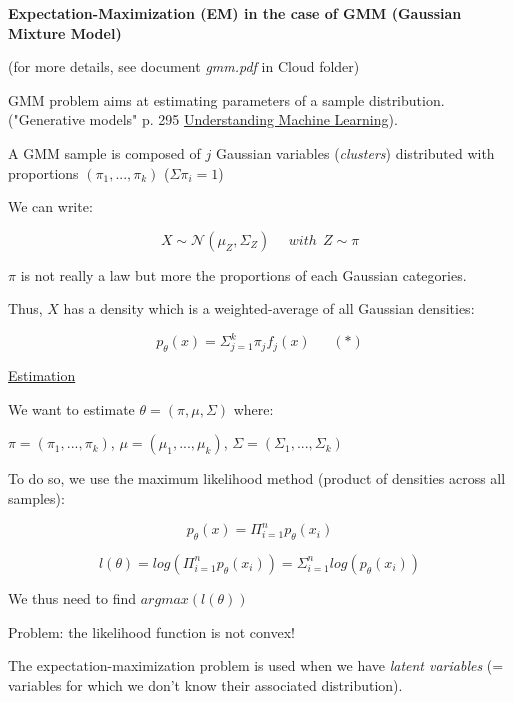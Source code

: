{\fontsize{12pt}{22pt} \textbf{Expectation-Maximization (EM) in the case of GMM (Gaussian Mixture Model)}\par}

\vspace{5mm}

(for more details, see document \textit{gmm.pdf} in Cloud folder)

\vspace{5mm}

GMM problem aims at estimating parameters of a sample distribution. ("Generative models" p. 295 \underline{Understanding Machine Learning}).

\vspace{5mm}

A GMM sample is composed of $j$ Gaussian variables (\textit{clusters}) distributed with proportions $(\pi_1,...,\pi_k)$ ($\Sigma \pi_i =1$)

We can write:

$$X \sim \mathcal{N}(\mu_{Z},\Sigma_{Z})~~~~~~with~~Z \sim \pi$$

$\pi$ is not really a law but more the proportions of each Gaussian categories.

Thus, $X$ has a density which is a weighted-average of all Gaussian densities:

$$p_\theta(x) = \Sigma_{j=1}^{k}\pi_j f_j(x)~~~~~~~(*)$$


\underline{Estimation}

We want to estimate $\theta = (\pi, \mu, \Sigma)$ where:

$\pi=(\pi_1,...,\pi_k)$, $\mu=(\mu_1,...,\mu_k)$, $\Sigma=(\Sigma_1,...,\Sigma_k)$

\vspace{5mm}

To do so, we use the maximum likelihood method (product of densities across all samples):

$$p_\theta(x)=\Pi_{i=1}^n p_\theta(x_i)$$

$$l(\theta)=log(\Pi_{i=1}^n p_\theta(x_i))=\Sigma_{i=1}^n log(p_\theta(x_i))$$

We thus need to find $argmax(l(\theta))$

Problem: the likelihood function is not convex!

\vspace{5mm}

The expectation-maximization problem is used when we have \textit{latent variables} (= variables for which we don't know their associated distribution).

